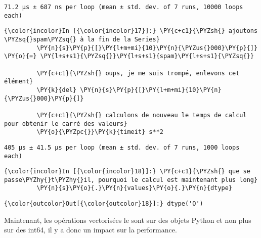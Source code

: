     \begin{Verbatim}[commandchars=\\\{\},frame=single,framerule=0.3mm,rulecolor=\color{cellframecolor}]
71.2 µs ± 687 ns per loop (mean ± std. dev. of 7 runs, 10000 loops each)
\end{Verbatim}

    \begin{Verbatim}[commandchars=\\\{\},frame=single,framerule=0.3mm,rulecolor=\color{cellframecolor}]
{\color{incolor}In [{\color{incolor}17}]:} \PY{c+c1}{\PYZsh{} ajoutons \PYZsq{}spam\PYZsq{} à la fin de la Series}
         \PY{n}{s}\PY{p}{[}\PY{l+m+mi}{10}\PY{n}{\PYZus{}000}\PY{p}{]} \PY{o}{=} \PY{l+s+s1}{\PYZsq{}}\PY{l+s+s1}{spam}\PY{l+s+s1}{\PYZsq{}}
         
         \PY{c+c1}{\PYZsh{} oups, je me suis trompé, enlevons cet élément}
         \PY{k}{del} \PY{n}{s}\PY{p}{[}\PY{l+m+mi}{10}\PY{n}{\PYZus{}000}\PY{p}{]}
         
         \PY{c+c1}{\PYZsh{} calculons de nouveau le temps de calcul pour obtenir le carré des valeurs}
         \PY{o}{\PYZpc{}}\PY{k}{timeit} s**2
\end{Verbatim}


    \begin{Verbatim}[commandchars=\\\{\},frame=single,framerule=0.3mm,rulecolor=\color{cellframecolor}]
405 µs ± 41.5 µs per loop (mean ± std. dev. of 7 runs, 1000 loops each)
\end{Verbatim}

    \begin{Verbatim}[commandchars=\\\{\},frame=single,framerule=0.3mm,rulecolor=\color{cellframecolor}]
{\color{incolor}In [{\color{incolor}18}]:} \PY{c+c1}{\PYZsh{} que se passe\PYZhy{}t\PYZhy{}il, pourquoi le calcul est maintenant plus long}
         \PY{n}{s}\PY{o}{.}\PY{n}{values}\PY{o}{.}\PY{n}{dtype}
\end{Verbatim}


\begin{Verbatim}[commandchars=\\\{\},frame=single,framerule=0.3mm,rulecolor=\color{cellframecolor}]
{\color{outcolor}Out[{\color{outcolor}18}]:} dtype('O')
\end{Verbatim}
            
    Maintenant, les opérations vectorisées le sont sur des objets Python et
non plus sur des int64, il y a donc un impact sur la performance.

